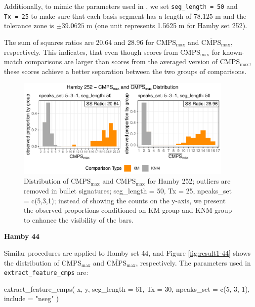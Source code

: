 Additionally, to mimic the parameters used in \citet{cmps}, we set
\texttt{seg\_length\ =\ 50} and \texttt{Tx\ =\ 25} to make sure that
each basis segment has a length of 78.125 \textmu m and the tolerance
zone is \(\pm 39.0625\) \textmu m (one unit represents 1.5625 \textmu m
for Hamby set 252).

The sum of squares ratios are 20.64 and 28.96 for
\(\mathrm{CMPS_{max}}\) and \(\mathrm{\overline{CMPS}_{max}}\),
respectively. This indicates, that even though scores from
\(\mathrm{CMPS_{max}}\) for known-match comparisons are larger than
scores from the averaged version of \(\mathrm{\overline{CMPS}_{max}}\),
these scores achieve a better separation between the two groups of
comparisons.

\begin{Schunk}
\begin{figure}

{\centering \includegraphics[width=400px]{ju-hofmann_files/figure-latex/result1-252-1} 

}

\caption[Distribution of $\mathrm{CMPS_{max}}$ and $\mathrm{\overline{CMPS}_{max}}$ for Hamby 252]{Distribution of $\mathrm{CMPS_{max}}$ and $\mathrm{\overline{CMPS}_{max}}$ for Hamby 252; outliers are removed in bullet signatures; seg\_length = 50, Tx = 25, npeaks\_set = c(5,3,1); instead of showing the counts on the y-axis, we present the observed proportions conditioned on KM group and KNM group to enhance the visibility of the bars. }\label{fig:result1-252}
\end{figure}
\end{Schunk}

\textbf{Hamby 44}

Similar procedures are applied to Hamby set 44, and Figure
\ref{fig:result1-44} shows the distribution of \(\mathrm{CMPS_{max}}\)
and \(\mathrm{\overline{CMPS}_{max}}\), respectively. The parameters
used in \texttt{extract\_feature\_cmps} are:

\begin{Schunk}
\begin{Sinput}
extract_feature_cmps(
  x, y,
  seg_length = 61,
  Tx = 30,
  npeaks_set = c(5, 3, 1),
  include = "nseg"
)
\end{Sinput}
\end{Schunk}


